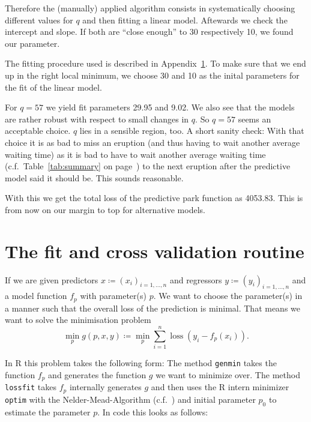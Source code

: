 \documentclass[english,final]{scrartcl}
\begin{document}
Therefore the (manually) applied algorithm consists in systematically choosing different values for $q$ and then fitting a linear model. Aftewards we check the intercept and slope. If both are \enquote{close enough} to 30 respectively 10, we found our parameter.

The fitting procedure used is described in Appendix~\ref{sec:implementation}. To make sure that we end up in the right local minimum, we choose 30 and 10 as the inital parameters for the fit of the linear model.


For $q = 57$ we yield fit parameters 29.95 and 9.02. We also see that the models are rather robust with respect to small changes in $q$. So $q = 57$ seems an acceptable choice. $q$ lies in a sensible region, too. A short sanity check: With that choice it is as bad to miss an eruption (and thus having to wait another average waiting time) as it is bad to have to wait another average waiting time (c.f.\ Table~\ref{tab:summary} on page~\pageref{tab:summary}) to the next eruption after the predictive model said it should be. This sounds reasonable.

With this we get the total loss of the predictive park function as 4053.83. This is from now on our margin to top for alternative models.


\section{The fit and cross validation routine}
\label{sec:implementation}

If we are given predictors $x \coloneqq (x_i)_{i=1,\dots,n}$ and regressors $ y \coloneqq (y_i)_{i=1,\dots,n}$ and a model function $f_p$ with parameter(s) $p$. We want to choose the parameter(s) in a manner such that the overall loss of the prediction is minimal. That means we want to solve the minimisation problem
\[
\min_p g(p, x, y) \coloneqq \min_p \sum_{i=1}^n \operatorname{loss}(y_i - f_p(x_i)).
\]

In R this problem takes the following form: The method \texttt{genmin} takes the function $f_p$ and generates the function $g$ we want to minimize over. The method \texttt{lossfit} takes $f_p$ internally generates $g$ and then uses the R intern minimizer \texttt{optim} with the Nelder-Mead-Algorithm (c.f.~\cite{nm}) and initial parameter $p_0$ to estimate the parameter $p$. In code this looks as follows:
\end{document}
